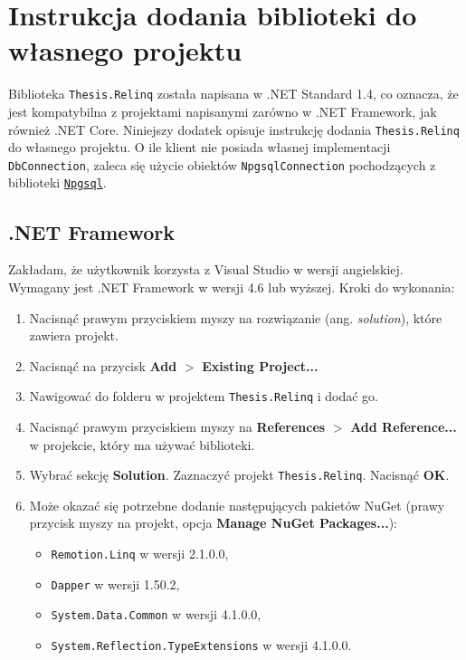 \chapter{Instrukcja dodania biblioteki do własnego projektu}
Biblioteka \texttt{Thesis.Relinq} została napisana w .NET Standard 1.4, co oznacza, że jest kompatybilna z projektami napisanymi zarówno w .NET Framework, jak również .NET Core. Niniejszy dodatek opisuje instrukcję dodania \texttt{Thesis.Relinq} do własnego projektu. O ile klient nie posiada własnej implementacji \texttt{DbConnection}, zaleca się użycie obiektów \texttt{NpgsqlConnection} pochodzących z biblioteki \href{http://www.npgsql.org/}{\texttt{Npgsql}}.

\section{.NET Framework}
Zakładam, że użytkownik korzysta z Visual Studio w wersji angielskiej. Wymagany jest .NET Framework w wersji 4.6 lub wyższej. Kroki do wykonania:

\begin{enumerate}
\setlength\itemsep{0em}
\item Nacisnąć prawym przyciskiem myszy na rozwiązanie (ang. \textit{solution}), które zawiera projekt.
\item Nacisnąć na przycisk \textbf{Add} $>$ \textbf{Existing Project...}
\item Nawigować do folderu w projektem \texttt{Thesis.Relinq} i dodać go.
\item Nacisnąć prawym przyciskiem myszy na \textbf{References} $>$ \textbf{Add Reference...} w projekcie, który ma używać biblioteki.
\item Wybrać sekcję \textbf{Solution}. Zaznaczyć projekt \texttt{Thesis.Relinq}. Nacisnąć \textbf{OK}.
\item Może okazać się potrzebne dodanie następujących pakietów NuGet (prawy przycisk myszy na projekt, opcja \textbf{Manage NuGet Packages...}):

\begin{itemize}
\setlength\itemsep{0em}
\item \texttt{Remotion.Linq} w wersji 2.1.0.0,
\item \texttt{Dapper} w wersji 1.50.2,
\item \texttt{System.Data.Common} w wersji 4.1.0.0,
\item \texttt{System.Reflection.TypeExtensions} w wersji 4.1.0.0.
\end{itemize}
\end{enumerate}

